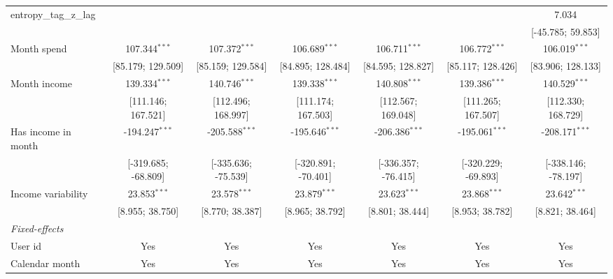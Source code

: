 \begin{table}[htbp]
\begin{threeparttable}[b]
\begin{tabular}{lcccccc}
         entropy\_tag\_z\_lag            &                     &                     &                     &                     &                     & 7.034\\   
                                         &                     &                     &                     &                     &                     & [-45.785; 59.853]\\   
         Month spend                     & 107.344$^{***}$     & 107.372$^{***}$     & 106.689$^{***}$     & 106.711$^{***}$     & 106.772$^{***}$     & 106.019$^{***}$\\   
                                         & [85.179; 129.509]   & [85.159; 129.584]   & [84.895; 128.484]   & [84.595; 128.827]   & [85.117; 128.426]   & [83.906; 128.133]\\   
         Month income                    & 139.334$^{***}$     & 140.746$^{***}$     & 139.338$^{***}$     & 140.808$^{***}$     & 139.386$^{***}$     & 140.529$^{***}$\\   
                                         & [111.146; 167.521]  & [112.496; 168.997]  & [111.174; 167.503]  & [112.567; 169.048]  & [111.265; 167.507]  & [112.330; 168.729]\\   
         Has income in month             & -194.247$^{***}$    & -205.588$^{***}$    & -195.646$^{***}$    & -206.386$^{***}$    & -195.061$^{***}$    & -208.171$^{***}$\\   
                                         & [-319.685; -68.809] & [-335.636; -75.539] & [-320.891; -70.401] & [-336.357; -76.415] & [-320.229; -69.893] & [-338.146; -78.197]\\   
         Income variability              & 23.853$^{***}$      & 23.578$^{***}$      & 23.879$^{***}$      & 23.623$^{***}$      & 23.868$^{***}$      & 23.642$^{***}$\\   
                                         & [8.955; 38.750]     & [8.770; 38.387]     & [8.965; 38.792]     & [8.801; 38.444]     & [8.953; 38.782]     & [8.821; 38.464]\\   
         \midrule
         \emph{Fixed-effects}\\
         User id                         & Yes                 & Yes                 & Yes                 & Yes                 & Yes                 & Yes\\  
         Calendar month                  & Yes                 & Yes                 & Yes                 & Yes                 & Yes                 & Yes\\  

\end{tabular}
\end{threeparttable}
\end{table}
